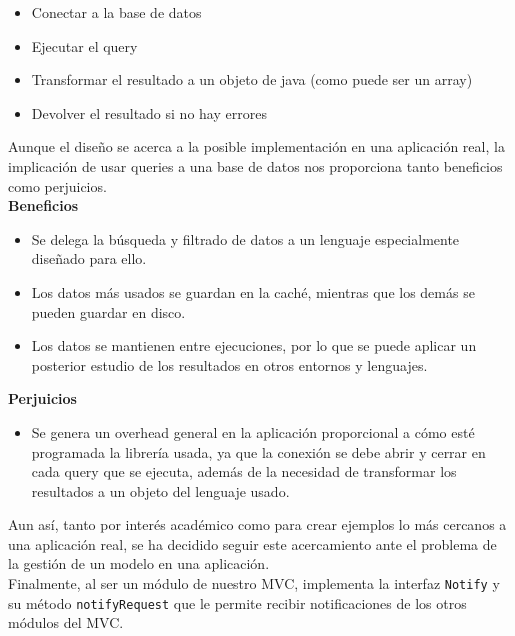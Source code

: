 \begin{itemize}
    \item Conectar a la base de datos
    \item Ejecutar el query
    \item Transformar el resultado a un objeto de java (como puede ser un array)
    \item Devolver el resultado si no hay errores
\end{itemize}\bigskip

Aunque el diseño se acerca a la posible implementación en una aplicación real, la implicación de usar queries a una base de datos nos proporciona tanto beneficios como perjuicios.\\

\textbf{Beneficios}\begin{itemize}
    \item Se delega la búsqueda y filtrado de datos a un lenguaje especialmente diseñado para ello.
    \item Los datos más usados se guardan en la caché, mientras que los demás se pueden guardar en disco.
    \item Los datos se mantienen entre ejecuciones, por lo que se puede aplicar un posterior estudio de los resultados en otros entornos y lenguajes.
\end{itemize}\bigskip

\textbf{Perjuicios}\begin{itemize}
    \item Se genera un overhead general en la aplicación proporcional a cómo esté programada la librería usada, ya que la conexión se debe abrir y cerrar en cada query que se ejecuta, además de la necesidad de transformar los resultados a un objeto del lenguaje usado.
\end{itemize}\bigskip

Aun así, tanto por interés académico como para crear ejemplos lo más cercanos a una aplicación real, se ha decidido seguir este acercamiento ante el problema de la gestión de un modelo en una aplicación.\\

Finalmente, al ser un módulo de nuestro MVC, implementa la interfaz \texttt{Notify} y su método \texttt{notifyRequest} que le permite recibir notificaciones de los otros módulos del MVC.
